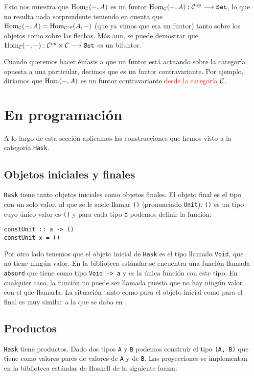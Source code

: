 Esto nos muestra que $\operatorname{Hom}_{\mathcal{C}}(-, A)$ es un funtor
$\operatorname{Hom}_{\mathcal{C}}(-, A) : \mathcal{C}^{op}\longrightarrow \texttt{Set}$, lo que no resulta
nada sorprendente teniendo en cuenta que
$\operatorname{Hom}_{\mathcal{C}}(-, A) = \operatorname{Hom}_{\mathcal{C}^{op}}(A, -)$ (que ya vimos que
era un funtor) tanto sobre los objetos
como sobre las flechas. Más aun, se puede demostrar
que $\operatorname{Hom}_{\mathcal{C}}(-, -) : \mathcal{C}^{op} \times \mathcal{C}\longrightarrow \texttt{Set}$ es un bifuntor.

Cuando queremos hacer énfasis a que un funtor está actuando sobre
la categoría opuesta a una particular, decimos que es un funtor
contravariante. Por ejemplo, diríamos que $\operatorname{Hom}(-, A)$ es un funtor
contravariante \textcolor{red}{desde la categoría $\mathcal{C}$}.

\section{En programación}
A lo largo de esta sección aplicamos las construcciones que hemos visto
a la categoría \texttt{Hask}.

\subsection{Objetos iniciales y finales}
\texttt{Hask} tiene tanto objetos iniciales como objetos finales. El
objeto final es el tipo con un solo valor, al que se le suele llamar
\texttt{()} (pronunciado \texttt{Unit}). \texttt{()} es un tipo
cuyo único valor es \texttt{()} y para cada tipo \texttt{a} podemos
definir la función:
\begin{verbatim}
constUnit :: a -> ()
constUnit x = ()
\end{verbatim}
Por otro lado tenemos que el objeto inicial de \texttt{Hask} es el tipo
llamado \texttt{Void}, que no tiene ningún valor. En la biblioteca
estándar se encuentra una función llamada \texttt{absurd}
que tiene
como tipo \texttt{Void -> a} y es la única función con este tipo.
En cualquier caso, la función no puede ser llamada puesto que no
hay ningún valor con el que llamarla. La situación tanto como para
el objeto inicial como para el final es muy similar a la que se daba
en \Set.

\subsection{Productos}
\texttt{Hask} tiene productos. Dado dos tipos \texttt{A} y
\texttt{B} podemos construir el tipo \texttt{(A, B)} que tiene
como valores pares de valores de \texttt{A} y de \texttt{B}.
Las proyecciones se implementan en la biblioteca estándar de
Haskell de la siguiente forma:

